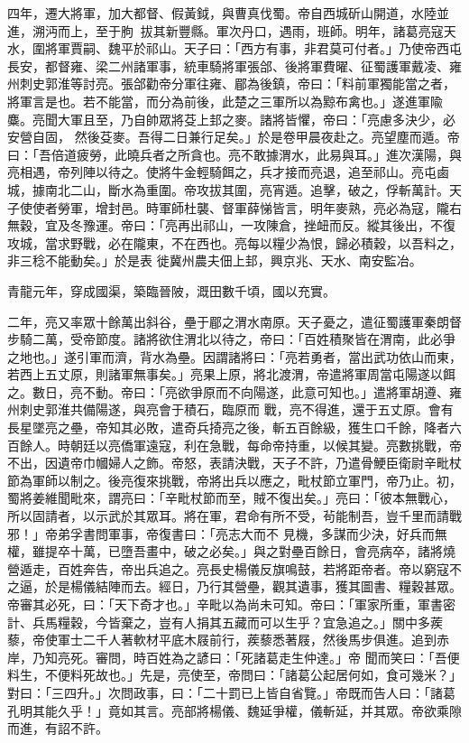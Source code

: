 \begin{pinyinscope}
 四年，遷大將軍，加大都督、假黃鉞，與曹真伐蜀。帝自西城斫山開道，水陸並進，溯沔而上，至于朐，拔其新豐縣。軍次丹口，遇雨，班師。明年，諸葛亮寇天水，圍將軍賈嗣、魏平於祁山。天子曰：「西方有事，非君莫可付者。」乃使帝西屯長安，都督雍、梁二州諸軍事，統車騎將軍張郃、後將軍費曜、征蜀護軍戴凌、雍州刺史郭淮等討亮。張郃勸帝分軍往雍、郿為後鎮，帝曰：「料前軍獨能當之者，將軍言是也。若不能當，而分為前後，此楚之三軍所以為黥布禽也。」遂進軍隃麋。亮聞大軍且至，乃自帥眾將芟上邽之麥。諸將皆懼，帝曰：「亮慮多決少，必安營自固，
 然後芟麥。吾得二日兼行足矣。」於是卷甲晨夜赴之。亮望塵而遁。帝曰：「吾倍道疲勞，此曉兵者之所貪也。亮不敢據渭水，此易與耳。」進次漢陽，與亮相遇，帝列陣以待之。使將牛金輕騎餌之，兵才接而亮退，追至祁山。亮屯鹵城，據南北二山，斷水為重圍。帝攻拔其圍，亮宵遁。追擊，破之，俘斬萬計。天子使使者勞軍，增封邑。時軍師杜襲、督軍薛悌皆言，明年麥熟，亮必為寇，隴右無穀，宜及冬豫運。帝曰：「亮再出祁山，一攻陳倉，挫衄而反。縱其後出，不復攻城，當求野戰，必在隴東，不在西也。亮每以糧少為恨，歸必積穀，以吾料之，非三稔不能動矣。」於是表
 徙冀州農夫佃上邽，興京兆、天水、南安監冶。



 青龍元年，穿成國渠，築臨晉陂，溉田數千頃，國以充實。



 二年，亮又率眾十餘萬出斜谷，壘于郿之渭水南原。天子憂之，遣征蜀護軍秦朗督步騎二萬，受帝節度。諸將欲住渭北以待之，帝曰：「百姓積聚皆在渭南，此必爭之地也。」遂引軍而濟，背水為壘。因謂諸將曰：「亮若勇者，當出武功依山而東，若西上五丈原，則諸軍無事矣。」亮果上原，將北渡渭，帝遣將軍周當屯陽遂以餌之。數日，亮不動。帝曰：「亮欲爭原而不向陽遂，此意可知也。」遣將軍胡遵、雍州刺史郭淮共備陽遂，與亮會于積石，臨原而
 戰，亮不得進，還于五丈原。會有長星墜亮之壘，帝知其必敗，遣奇兵掎亮之後，斬五百餘級，獲生口千餘，降者六百餘人。時朝廷以亮僑軍遠寇，利在急戰，每命帝持重，以候其變。亮數挑戰，帝不出，因遺帝巾幗婦人之飾。帝怒，表請決戰，天子不許，乃遣骨鯁臣衛尉辛毗杖節為軍師以制之。後亮復來挑戰，帝將出兵以應之，毗杖節立軍門，帝乃止。初，蜀將姜維聞毗來，謂亮曰：「辛毗杖節而至，賊不復出矣。」亮曰：「彼本無戰心，所以固請者，以示武於其眾耳。將在軍，君命有所不受，茍能制吾，豈千里而請戰邪！」帝弟孚書問軍事，帝復書曰：「亮志大而不
 見機，多謀而少決，好兵而無權，雖提卒十萬，已墮吾畫中，破之必矣。」與之對壘百餘日，會亮病卒，諸將燒營遁走，百姓奔告，帝出兵追之。亮長史楊儀反旗鳴鼓，若將距帝者。帝以窮寇不之逼，於是楊儀結陣而去。經日，乃行其營壘，觀其遺事，獲其圖書、糧穀甚眾。帝審其必死，曰：「天下奇才也。」辛毗以為尚未可知。帝曰：「軍家所重，軍書密計、兵馬糧穀，今皆棄之，豈有人捐其五藏而可以生乎？宜急追之。」關中多蒺藜，帝使軍士二千人著軟材平底木屐前行，蒺藜悉著屐，然後馬步俱進。追到赤岸，乃知亮死。審問，時百姓為之諺曰：「死諸葛走生仲達。」帝
 聞而笑曰：「吾便料生，不便料死故也。」先是，亮使至，帝問曰：「諸葛公起居何如，食可幾米？」對曰：「三四升。」次問政事，曰：「二十罰已上皆自省覽。」帝既而告人曰：「諸葛孔明其能久乎！」竟如其言。亮部將楊儀、魏延爭權，儀斬延，并其眾。帝欲乘隙而進，有詔不許。




\end{pinyinscope}
